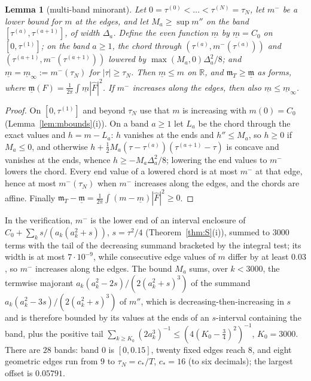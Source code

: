 \documentclass[11pt]{amsart}
\newtheorem{lemma}[theorem]{Lemma}
\theoremstyle{definition}
\theoremstyle{remark}
\newcommand{\R}{\mathbb R}
\newcommand{\Fh}{\widehat F}
\newcommand{\mT}{\mathfrak m_T}
\begin{document}
\begin{lemma}[multi-band minorant]\label{lem:multiband}
Let $0=\tau^{(0)}<\dots<\tau^{(N)}=\tau_N$, let $m^-$ be a lower bound for $m$ at the edges,
and let $M_a\ge\sup m''$ on the band $[\tau^{(a)},\tau^{(a+1)}]$, of width $\Delta_a$. Define the even
function $\underline m$ by $\underline m=C_0$ on $[0,\tau^{(1)}]$; on the band $a\ge1$, the chord through
$(\tau^{(a)},m^-(\tau^{(a)}))$ and $(\tau^{(a+1)},m^-(\tau^{(a+1)}))$ lowered by $\max(M_a,0)\Delta_a^2/8$;
and $\underline m=\underline m_\infty:=m^-(\tau_N)$ for $|\tau|\ge\tau_N$. Then $\underline m\le m$ on
$\R$, and $\mT\ge\underline{\mathfrak m}$ as forms, where
$\underline{\mathfrak m}(F)=\frac1{2\pi}\int\underline m|\Fh|^2$. If $m^-$ increases along the edges, then also
$\underline m\le\underline m_\infty$.
\end{lemma}
\begin{proof}
On $[0,\tau^{(1)}]$ and beyond $\tau_N$ use that $m$ is increasing with $m(0)=C_0$
(Lemma~\ref{lem:mbounds}(i)). On a band $a\ge1$ let $L_a$ be the chord through the exact values and
$h=m-L_a$: $h$ vanishes at the ends and $h''\le M_a$, so $h\ge0$ if $M_a\le0$, and otherwise
$h+\frac12M_a(\tau-\tau^{(a)})(\tau^{(a+1)}-\tau)$ is concave and vanishes at the ends, whence
$h\ge-M_a\Delta_a^2/8$; lowering the end values to $m^-$ lowers the chord. Every end value of a
lowered chord is at most $m^-$ at that edge, hence at most $m^-(\tau_N)$ when $m^-$ increases along the
edges, and the chords are affine. Finally $\mT-\underline{\mathfrak m}=\frac1{2\pi}\int(m-\underline m)|\Fh|^2\ge0$.
\end{proof}
In the verification, $m^-$ is the lower end of an interval enclosure of $C_0+\sum_ks/(a_k(a_k^2+s))$, $s=\tau^2/4$
(Theorem~\ref{thm:S}(i)), summed to $3000$ terms with the tail of the decreasing summand bracketed by the
integral test; its width is at most $7\cdot10^{-9}$, while consecutive edge values of $m$ differ by at
least $0.03$, so $m^-$ increases along the edges. The bound $M_a$ sums, over $k<3000$, the termwise
majorant $a_k(a_k^2-2s)/(2(a_k^2+s)^3)$ of the summand $a_k(a_k^2-3s)/(2(a_k^2+s)^3)$ of $m''$, which is
decreasing-then-increasing in $s$ and is therefore bounded by its values at the ends of an $s$-interval
containing the band, plus the positive tail $\sum_{k\ge K_0}(2a_k^3)^{-1}\le(4(K_0-\frac34)^2)^{-1}$,
$K_0=3000$. There are $28$ bands: band $0$ is $[0,0.15]$, twenty fixed edges reach $8$, and eight
geometric edges run from $9$ to $\tau_N=c_*/T$, $c_*=16$ (to six decimals); the largest offset is $0.05791$.
\end{document}
